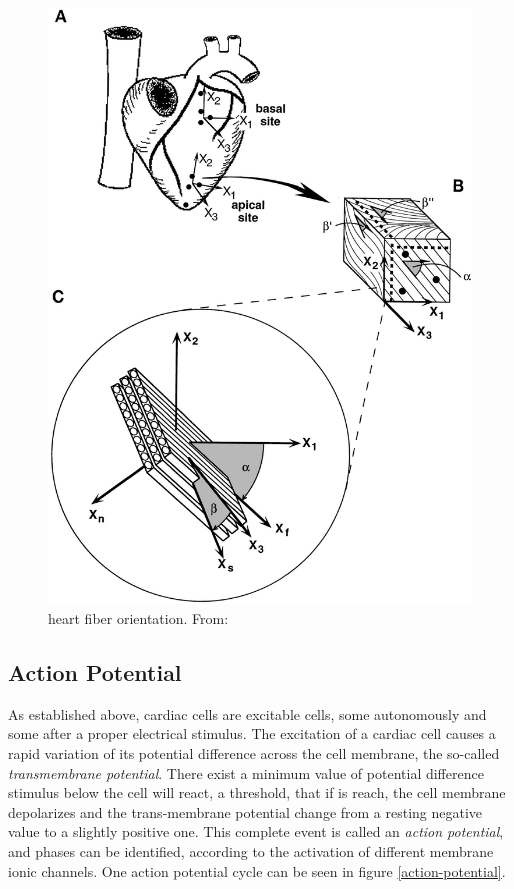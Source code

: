\documentclass[letterpaper, twoside]{article}     	    %
\begin{document}
\begin{figure}[H]
\centering
\includegraphics[scale=.14]{fig/fundamentals-direccionmiocitos}
\caption{heart fiber orientation. From: \cite{shearstrain-fiberorientation}} \label{orientacionmiocitos}
\end{figure}

\subsection{Action Potential} \label{Action_Potential}

As established above, cardiac cells are excitable cells, some autonomously and some after a proper electrical stimulus. The excitation of a cardiac cell causes a rapid variation of its potential difference across the cell membrane, the so-called \textsl{transmembrane potential}. There exist a minimum value of potential difference stimulus below the cell will react, a threshold, that if is reach, the cell membrane depolarizes and the trans-membrane potential change from a resting negative value to a slightly positive one. This complete event is called an \textsl{action potential}, and phases can be identified, according to the activation of different membrane ionic channels. One action potential cycle can be seen in figure \ref{action-potential}. 
\end{document}
